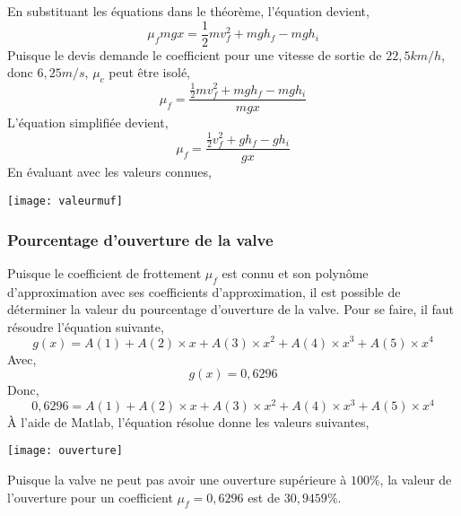\documentclass[12pt]{article}
\begin{document}
En substituant les équations dans le théorème, l'équation devient,
\begin{equation}
\mu_fmgx = \frac{1}{2}mv_f^2 + mgh_f - mgh_i
\end{equation}
Puisque le devis demande le coefficient pour une vitesse de sortie de $22,5km/h$, donc $6,25m/s$, $\mu_c$ peut être isolé,
\begin{equation}
\mu_f = \frac{\frac{1}{2}mv_f^2 + mgh_f - mgh_i}{mgx}
\end{equation}
L'équation simplifiée devient,
\begin{equation}
\mu_f = \frac{\frac{1}{2}v_f^2 + gh_f - gh_i}{gx}
\end{equation}
En évaluant avec les valeurs connues,
\begin{center}
	\texttt{[image: valeurmuf]}
\end{center}
\subsubsection{Pourcentage d'ouverture de la valve}
Puisque le coefficient de frottement $\mu_f$ est connu et son polynôme d'approximation avec ses coefficients d'approximation, il est possible de déterminer la valeur du pourcentage d'ouverture de la valve.
\newline
\newline
Pour se faire, il faut résoudre l'équation suivante,
\begin{equation}
g(x) = A(1) + A(2)\times x + A(3)\times x^2 + A(4)\times x^3 + A(5)\times x^4
\end{equation}
Avec,
\begin{equation}
g(x) = 0,6296
\end{equation}
Donc,
\begin{equation}
0,6296 = A(1) + A(2)\times x + A(3)\times x^2 + A(4)\times x^3 + A(5)\times x^4
\end{equation}
À l'aide de Matlab, l'équation résolue donne les valeurs suivantes,
\begin{center}
	\texttt{[image: ouverture]}
\end{center}
Puisque la valve ne peut pas avoir une ouverture supérieure à $100\%$, la valeur de l'ouverture pour un coefficient $\mu_f = 0,6296$ est de $30,9459\%$.
\end{document}
